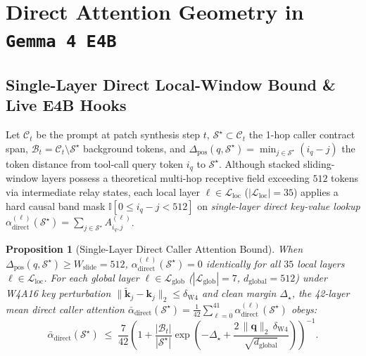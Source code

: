 \documentclass[10pt,twocolumn,letterpaper]{article}
\newtheorem{proposition}{Proposition}
\begin{document}
\section{Direct Attention Geometry in \texttt{Gemma 4 E4B}}
\label{sec:theory}

\subsection{Single-Layer Direct Local-Window Bound \& Live E4B Hooks}
Let $\mathcal{C}_t$ be the prompt at patch synthesis step $t$, $\mathcal{S}^\star \subset \mathcal{C}_t$ the 1-hop caller contract span, $\mathcal{B}_t = \mathcal{C}_t \setminus \mathcal{S}^\star$ background tokens, and $\Delta_{\text{pos}}(q, \mathcal{S}^\star) = \min_{j \in \mathcal{S}^\star}(i_q - j)$ the token distance from tool-call query token $i_q$ to $\mathcal{S}^\star$. Although stacked sliding-window layers possess a theoretical multi-hop receptive field exceeding $512$ tokens via intermediate relay states, each local layer $\ell \in \mathcal{L}_{\text{loc}}$ ($|\mathcal{L}_{\text{loc}}|{=}35$) applies a hard causal band mask $\mathbb{I}[0 \le i_q - j < 512]$ on \emph{single-layer direct key-value lookup} $\alpha_{\text{direct}}^{(\ell)}(\mathcal{S}^\star) = \sum_{j \in \mathcal{S}^\star} A_{i_q, j}^{(\ell)}$.

\begin{proposition}[Single-Layer Direct Caller Attention Bound]
\label{prop:dilution}
When $\Delta_{\text{pos}}(q, \mathcal{S}^\star) \ge W_{\text{slide}} = 512$, $\alpha_{\text{direct}}^{(\ell)}(\mathcal{S}^\star) = 0$ identically for all $35$ local layers $\ell \in \mathcal{L}_{\text{loc}}$. For each global layer $\ell \in \mathcal{L}_{\text{glob}}$ ($|\mathcal{L}_{\text{glob}}|{=}7$, $d_{\text{global}}{=}512$) under W4A16 key perturbation $\|\tilde{\bm{k}}_j - \bm{k}_j\|_2 \le \delta_{\text{W4}}$ and clean margin $\Delta_\star$, the 42-layer mean direct caller attention $\bar{\alpha}_{\text{direct}}(\mathcal{S}^\star) = \frac{1}{42}\sum_{\ell=0}^{41}\alpha_{\text{direct}}^{(\ell)}(\mathcal{S}^\star)$ obeys:
\begin{equation}
\label{eq:attention_bound}
\bar{\alpha}_{\text{direct}}(\mathcal{S}^\star) \;\le\; \frac{7}{42}\left( 1 + \frac{|\mathcal{B}_t|}{|\mathcal{S}^\star|} \exp\!\left( -\Delta_\star + \frac{2\,\|\bm{q}\|_2\,\delta_{\text{W4}}}{\sqrt{d_{\text{global}}}} \right) \right)^{-1}.
\end{equation}
\end{proposition}
\end{document}
